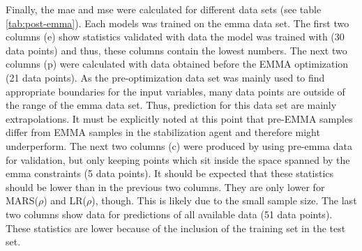 \iffalse
\begin{align}
    \label{eq:r2-krr-g}
    R^2(\gamma_{krr}) &= -0.50 \pm 0.25\\
    \label{eq:r2-krr-p}
    R^2(\rho_{krr})   &= -0.45 \pm 0.52\\
    \label{eq:r2-svm-g}
    R^2(\gamma_{svm}) &= -0.37 \pm 0.39\\
    \label{eq:r2-svm-p}
    R^2(\rho_{svm})   &= -0.95 \pm 0.44
\end{align}
\fi

%
Finally, the \gls{mae} and \gls{mse} were calculated for different data sets 
(see table \ref{tab:post-emma}). 
Each models was trained on the \gls{emma} data set.
The first two columns (e) show statistics validated with data the model was trained with (30 data points) and thus, 
these columns contain the lowest numbers. 
The next two columns (p) were calculated with data obtained before the EMMA optimization (21 data points). 
As the pre-optimization data set was mainly used to find appropriate boundaries for the input variables, 
many data points are outside of the range of the \gls{emma} data set. 
Thus, prediction for this data set are mainly extrapolations. 
It must be explicitly noted at this point that pre-EMMA samples differ from EMMA samples 
in the stabilization agent and therefore might underperform. 
The next two columns (c) were produced by using pre-\gls{emma} data for validation, 
but only keeping points which sit inside the space spanned by the \gls{emma} constraints (5 data points). 
It should be expected that these statistics should be lower than in the previous two columns. 
They are only lower for MARS($\rho$) and LR($\rho$), though. 
This is likely due to the small sample size.
The last two columns show data for predictions of all available data (51 data points). 
These statistics are lower because of the inclusion of the training set in the test set. 


